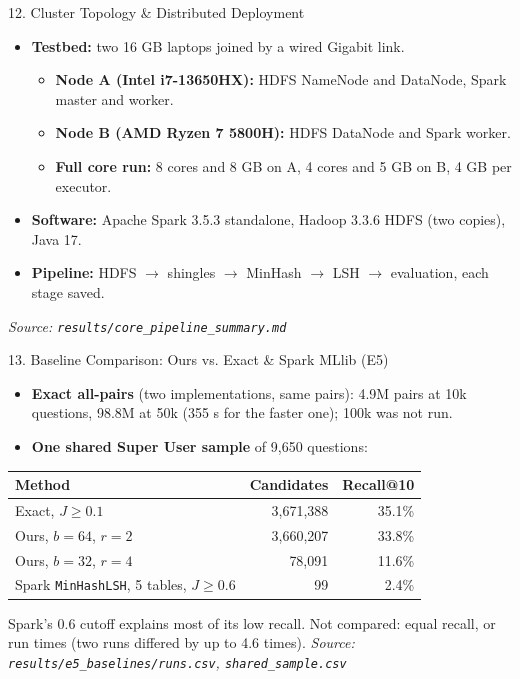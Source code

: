 \documentclass[aspectratio=169,10pt]{beamer}
\begin{document}
\begin{frame}{12. Cluster Topology \& Distributed Deployment}
  \begin{itemize}
    \item \textbf{Testbed:} two 16 GB laptops joined by a wired Gigabit link.
      \begin{itemize}
        \item \textbf{Node A (Intel i7-13650HX):} HDFS NameNode and DataNode, Spark master and worker.
        \item \textbf{Node B (AMD Ryzen 7 5800H):} HDFS DataNode and Spark worker.
        \item \textbf{Full core run:} 8 cores and 8 GB on A, 4 cores and 5 GB on B, 4 GB per executor.
      \end{itemize}
    \item \textbf{Software:} Apache Spark 3.5.3 standalone, Hadoop 3.3.6 HDFS (two copies), Java 17.
    \item \textbf{Pipeline:} HDFS $\to$ shingles $\to$ MinHash $\to$ LSH $\to$ evaluation, each stage saved.
  \end{itemize}
  \vfill
  \footnotesize{\textit{Source: \texttt{results/core\_pipeline\_summary.md}}}
\end{frame}

\begin{frame}[shrink=5]{13. Baseline Comparison: Ours vs. Exact \& Spark MLlib (E5)}
  \begin{itemize}
    \item \textbf{Exact all-pairs} (two implementations, same pairs): 4.9M pairs at 10k questions, 98.8M at 50k (355 s for the faster one); 100k was not run.
    \item \textbf{One shared Super User sample} of 9,650 questions:
  \end{itemize}
  \begin{center}\begin{tabular}{lrr}
    \toprule
    Method & Candidates & Recall@10 \\
    \midrule
    Exact, $J \ge 0.1$ & 3,671,388 & 35.1\% \\
    Ours, $b=64$, $r=2$ & 3,660,207 & 33.8\% \\
    Ours, $b=32$, $r=4$ & 78,091 & 11.6\% \\
    Spark \texttt{MinHashLSH}, 5 tables, $J \ge 0.6$ & 99 & 2.4\% \\
    \bottomrule
  \end{tabular}\end{center}
  \footnotesize{Spark's 0.6 cutoff explains most of its low recall. Not compared: equal recall, or run times (two runs differed by up to 4.6 times).}
  \vfill
  \footnotesize{\textit{Source: \texttt{results/e5\_baselines/runs.csv}, \texttt{shared\_sample.csv}}}
\end{frame}
\end{document}
